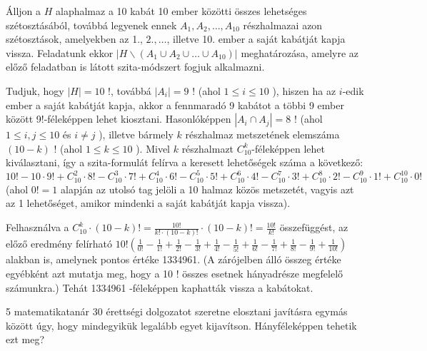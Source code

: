 \begin{solution}
Álljon a $H$ alaphalmaz a 10 kabát 10 ember közötti összes lehetséges
szétosztásából, továbbá legyenek ennek $A_{1},A_{2},\ldots,A_{10}$
részhalmazai azon szétosztások, amelyekben az 1., $2.,\ldots$, illetve
10. ember a saját kabátját kapja vissza. Feladatunk ekkor $\left|H\backslash\left(A_{1}\cup A_{2}\cup\ldots\cup A_{10}\right)\right|$
meghatározása, amelyre az előző feladatban is látott szita-módszert
fogjuk alkalmazni.

Tudjuk, hogy $|H|=10$ !, továbbá $\left|A_{i}\right|=9$ ! (ahol
$1\leq i\leq10$ ), hiszen ha az $i$-edik ember a saját kabátját
kapja, akkor a fennmaradó 9 kabátot a többi 9 ember között 9!-féleképpen
lehet kiosztani. Hasonlóképpen $\left|A_{i}\cap A_{j}\right|=8$ !
(ahol $1\leq i,j\leq10$ és $i\neq j$ ), illetve bármely $k$ részhalmaz
metszetének elemszáma $(10-k)$ ! (ahol $1\leq k\leq10$ ). Mivel
$k$ részhalmazt $C_{10}^{k}$-féleképpen lehet kiválasztani, így
a szita-formulát felírva a keresett lehetőségek száma a következő:\\
 $10!-10\cdot9!+C_{10}^{2}\cdot8!-C_{10}^{3}\cdot7!+C_{10}^{4}\cdot6!-C_{10}^{5}\cdot5!+C_{10}^{6}\cdot4!-C_{10}^{7}\cdot3!+C_{10}^{8}\cdot2!-C_{10}^{9}\cdot1!+C_{10}^{10}\cdot0!$\\
 (ahol $0!=1$ alapján az utolsó tag jelöli a 10 halmaz közös metszetét,
vagyis azt az 1 lehetőséget, amikor mindenki a saját kabátját kapja
vissza).

Felhasználva a $C_{10}^{k}\cdot(10-k)!=\frac{10!}{k!\cdot(10-k)!}\cdot(10-k)!=\frac{10!}{k!}$
összefüggést, az előző eredmény felírható $10!\left(\frac{1}{0!}-\frac{1}{1!}+\frac{1}{2!}-\frac{1}{3!}+\frac{1}{4!}-\frac{1}{5!}+\frac{1}{6!}-\frac{1}{7!}+\frac{1}{8!}-\frac{1}{9!}+\frac{1}{10!}\right)$
alakban is, amelynek pontos értéke 1334961. (A zárójelben álló összeg
értéke egyébként azt mutatja meg, hogy a 10 ! összes esetnek hányadrésze
megfelelő számunkra.) Tehát 1334961 -féleképpen kaphatták vissza a
kabátokat. 
\end{solution}
\begin{extraproblem}
5 matematikatanár 30 érettségi dolgozatot szeretne elosztani javításra
egymás között úgy, hogy mindegyikük legalább egyet kijavítson. Hányféleképpen
tehetik ezt meg? 
\end{extraproblem}

